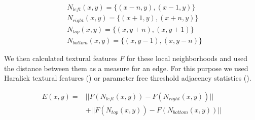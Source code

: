 \documentclass[pdftex,12pt,a4paper]{report}
\begin{document}
\begin{equation}
\begin{split}
	& N_{left}(x,y) = \{ (x-n,y), (x-1,y) \} \\
	& N_{right}(x,y) = \{ (x+1,y), (x+n,y) \} \\
	& N_{top}(x,y) = \{ (x,y+n), (x,y+1) \} \\
	& N_{bottom}(x,y) = \{ (x,y-1), (x,y-n) \}
\end{split}
\end{equation}

We then calculated textural features $F$ for these local neighborhoods and used the distance between them as a measure for an edge. For this purpose we used Haralick textural features (\cite{haralick1973textural}) or parameter free threshold adjacency statistics (\cite{hamilton2007fast}). 

\begin{equation}
\begin{split}
E(x,y) = & ||F(N_{left}(x,y)) -F(N_{right}(x,y))|| \\ & + ||F(N_{top}(x,y)) - F(N_{bottom}(x,y))||
\end{split}
\end{equation}
\end{document}
